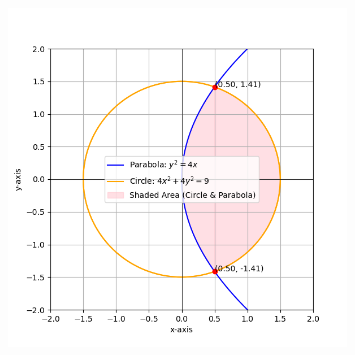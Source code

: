 \documentclass[journal]{IEEEtran}
\numberwithin{equation}{enumi}
\numberwithin{figure}{enumi}
\begin{document}
	\begin{figure}[ht]
		\centering
		\includegraphics[width=0.8\textwidth]{figs/fig.png}
	\end{figure}
\end{document}
